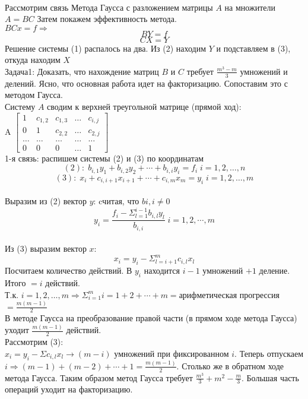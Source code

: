 \documentclass[oneside, final, 14pt]{extreport}
\begin{document}
\\
Рассмотрим связь Метода Гаусса с разложением матрицы \( A \) на множители \( A=BC \)
Затем покажем эффективность метода.
\\
\(BCx=f \Rightarrow \)
\begin{equation}BY=f\end{equation}
\begin{equation}CX=Y\end{equation}
Решение системы (1) распалось на два. Из (2) находим \(Y\) и подставляем в (3), откуда находим \(X\)
\\
Задача1: Доказать, что нахождение матриц \( B \) и \( C\) требует \(\frac{m^3-m}{3}\) умножений и делений.
Ясно, что основная работа идет на факторизацию. Сопоставим это с методом Гаусса.
\\
Систему \(A\) сводим к верхней треугольной матрице (прямой ход):
\\
A \(\begin{bmatrix} 1 & c_{1,2} & c_{1,3} & \ldots & c_{i,j} \\ 0 & 1 & c_{2,2} & \ldots & c_{2,j} \\ \ldots & \ldots & \ldots & \ldots & \ldots \\ 0 & 0 & 0 & \ldots & 1 \end{bmatrix} \)
\\
1-я связь: распишем системы (2) и (3) по координатам
\\
\[(2): \; b_{i,1}y_1+b_{i,2}y_2+\cdots+b_{i,i}y_i=f_i \; i=1, 2, \ldots, n\]
\[(3):\; x_i+c_{i,i+1}x_{i+1}+\cdots+c_{i,m}x_m=y_i \; i=1, 2, \ldots, m\]
\\
Выразим из (2) вектор \(y\): cчитая, что \(b{i,i}\neq 0\)
\[ y_i=\frac{f_i-\Sigma_{l=1}^{i-1}b_{i,l}y_l}{b_{i,i}} \; i=1,2, \cdots, m\]
\\
Из (3) выразим вектор \(x\):
\[x_i=y_i-\Sigma_{l=i+1}^mc_{i,l}x_l\]
Посчитаем количество действий. В \(y_i\) находится \(i-1\) умножений \(+1\) деление. Итого \(=i\) действий.
\\
Т.к. \(i=1,2, \ldots ,m \Rightarrow \Sigma_{i=1}^mi=1+2+ \cdots +m=\){арифметическая прогрессия}\(=\frac{m(m-1)}{2}\) 
\\ 
В методе Гаусса на преобразование правой части (в прямом ходе метода Гаусса) уходит \(\frac{m(m-1)}{2}\) действий.
\\
Рассмотрим (3):
\\
\(x_i=y_i-\Sigma c_{i,l}x_l \rightarrow(m-i)\) умножений при фиксированном \(i\). Теперь отпускаем \(i \Rightarrow (m-1)+(m-2)+\cdots +1=\frac{m(m-1)}{2}\). Столько же в обратном ходе метода Гаусса. Таким образом метод Гаусса требует \(\frac{m^3}{3}+m^2- \frac{m}{3}\). Большая часть операций уходит на факторизацию.
\\
   
\end{document}
